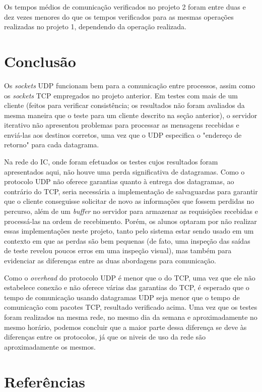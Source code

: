 \documentclass[11pt, brazil]{article} %
\begin{document}
Os tempos médios de comunicação verificados no projeto 2 foram entre duas e dez vezes menores do que os tempos verificados para as mesmas operações realizadas no projeto 1, dependendo da operação realizada.


\section{Conclusão}

Os \emph{sockets} UDP funcionam bem para a comunicação entre processos, assim como os \emph{sockets} TCP empregados no projeto anterior. 
Em testes com mais de um cliente (feitos para verificar consistência; os resultados não foram avaliados da mesma maneira que o teste para um cliente descrito na seção anterior), o servidor iterativo não apresentou problemas para processar as mensagens recebidas e enviá-las aos destinos corretos, uma vez que o UDP especifica o "endereço de retorno" para cada datagrama. 

Na rede do IC, onde foram efetuados os testes cujos resultados foram apresentados aqui, não houve uma perda significativa de datagramas. 
Como o protocolo UDP não oferece garantias quanto à entrega dos datagramas, ao contrário do TCP, seria necessária a implementação de salvaguardas para garantir que o cliente conseguisse solicitar de novo as informações que fossem perdidas no percurso, além de um \emph{buffer} no servidor para armazenar as requisições recebidas e processá-las na ordem de recebimento.
Porém, os alunos optaram por não realizar essas implementações neste projeto, tanto pelo sistema estar sendo usado em um contexto em que as perdas são bem pequenas (de fato, uma inspeção das saídas de teste revelou poucos erros em uma inspeção visual), mas também para evidenciar as diferenças entre as duas abordagens para comunicação.

Como o \emph{overhead} do protocolo UDP é menor que o do TCP, uma vez que ele não estabelece conexão e não oferece várias das garantias do TCP, é esperado que o tempo de comunicação usando datagramas UDP seja menor que o tempo de comunicação com pacotes TCP, resultado verificado acima. 
Uma vez que os testes foram realizados na mesma rede, no mesmo dia da semana e aproximadamente no mesmo horário, podemos concluir que a maior parte dessa diferença se deve às diferenças entre os protocolos, já que os niveis de uso da rede são aproximadamente os mesmos.

\section{Referências}
\end{document}
